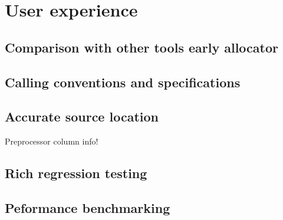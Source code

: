 %
%
%

\chapter{User experience}

\section{Comparison with other tools early allocator}

\section{Calling conventions and specifications}

\section{Accurate source location}

Preprocessor column info!

\section{Rich regression testing}

\section{Peformance benchmarking}

